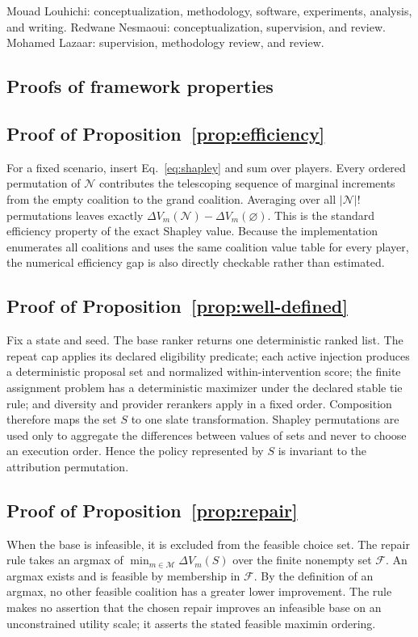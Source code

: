 \documentclass[pdflatex,sn-mathphys-num]{sn-jnl}
\theoremstyle{thmstyleone}
\theoremstyle{thmstyletwo}
\theoremstyle{thmstylethree}
\newcommand{\Players}{\mathcal{N}}
\newcommand{\Models}{\mathcal{M}}
\newcommand{\Utility}{V}
\begin{document}
Mouad Louhichi: conceptualization, methodology, software, experiments, analysis, and writing. Redwane Nesmaoui: conceptualization, supervision, and review. Mohamed Lazaar: supervision, methodology review, and review.

\begin{appendices}

\section{Proofs of framework properties}\label{app:proofs}

\subsection*{Proof of Proposition~\ref{prop:efficiency}}
For a fixed scenario, insert Eq.~\eqref{eq:shapley} and sum over players. Every ordered permutation of $\Players$ contributes the telescoping sequence of marginal increments from the empty coalition to the grand coalition. Averaging over all $|\Players|!$ permutations leaves exactly $\Delta\Utility_m(\Players)-\Delta\Utility_m(\varnothing)$. This is the standard efficiency property of the exact Shapley value. Because the implementation enumerates all coalitions and uses the same coalition value table for every player, the numerical efficiency gap is also directly checkable rather than estimated.

\subsection*{Proof of Proposition~\ref{prop:well-defined}}
Fix a state and seed. The base ranker returns one deterministic ranked list. The repeat cap applies its declared eligibility predicate; each active injection produces a deterministic proposal set and normalized within-intervention score; the finite assignment problem has a deterministic maximizer under the declared stable tie rule; and diversity and provider rerankers apply in a fixed order. Composition therefore maps the set $S$ to one slate transformation. Shapley permutations are used only to aggregate the differences between values of sets and never to choose an execution order. Hence the policy represented by $S$ is invariant to the attribution permutation.

\subsection*{Proof of Proposition~\ref{prop:repair}}
When the base is infeasible, it is excluded from the feasible choice set. The repair rule takes an argmax of $\min_{m\in\Models}\Delta\Utility_m(S)$ over the finite nonempty set $\mathcal{F}$. An argmax exists and is feasible by membership in $\mathcal{F}$. By the definition of an argmax, no other feasible coalition has a greater lower improvement. The rule makes no assertion that the chosen repair improves an infeasible base on an unconstrained utility scale; it asserts the stated feasible maximin ordering.


\end{appendices}
\end{document}
